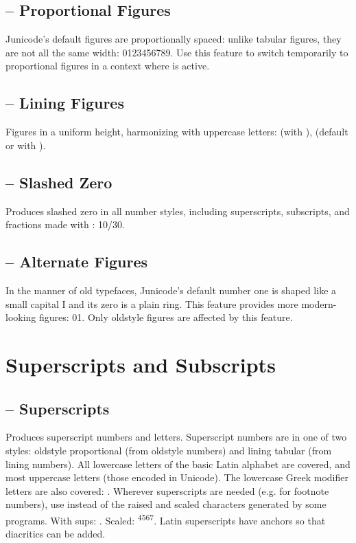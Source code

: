 \subsection{ – Proportional Figures}
Junicode's default figures are proportionally spaced: unlike tabular figures, they are not
all the same width: 0123456789. Use this feature to switch temporarily to proportional figures in a context where
 is active.

\subsection{ – Lining Figures}
Figures in a uniform height, harmonizing with uppercase letters:  (with
),  (default or with ).

\subsection{ – Slashed Zero}
Produces slashed zero in all number styles, including superscripts, subscripts, and fractions made with
: {   
 10/30}.

\subsection{ – Alternate Figures}
In the manner of old typefaces, Junicode's default number one is shaped like a small capital I and
its zero is a plain ring. This feature provides more modern-looking figures:
{01}. Only oldstyle figures
are affected by this feature.

\section{Superscripts and Subscripts}

\subsection{ – Superscripts}
Produces superscript numbers and letters. Superscript numbers are in one of two styles: 
oldstyle proportional (from oldstyle numbers) and lining tabular (from lining numbers). All lowercase
letters of the basic Latin alphabet are covered, and most uppercase letters (those encoded in Unicode).
The lowercase Greek modifier letters are also covered:  .
Wherever superscripts are needed (e.g. for footnote numbers), use  instead of the raised 
and scaled characters generated by some programs. With sups: . Scaled: \textsuperscript{4567}. 
Latin superscripts have anchors so that diacritics can be added.

